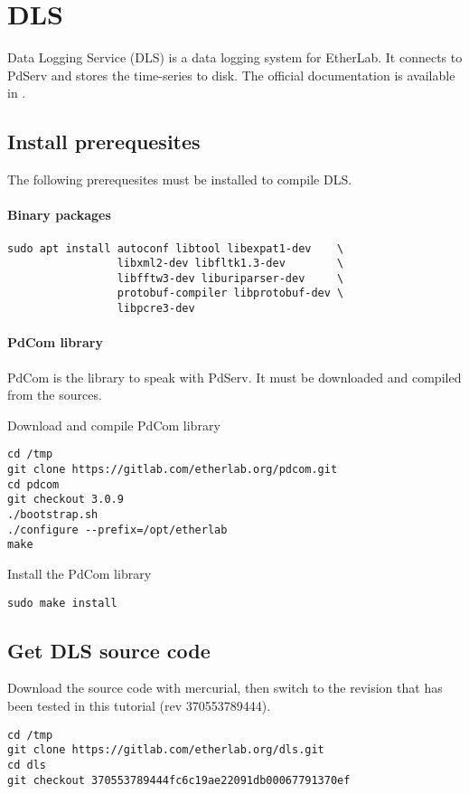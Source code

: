 \chapter{DLS}


\label{chap:dls}
Data Logging Service (DLS) is a data logging system for EtherLab. It
connects to PdServ and stores the time-series to disk.
The official documentation is available in \cite{dls_user_manual}.


\section{Install prerequesites}

The following prerequesites must be installed to compile DLS.

\subsubsection{Binary packages}
\begin{verbatim}
sudo apt install autoconf libtool libexpat1-dev    \
                 libxml2-dev libfltk1.3-dev        \
                 libfftw3-dev liburiparser-dev     \
                 protobuf-compiler libprotobuf-dev \
                 libpcre3-dev
\end{verbatim}

\subsubsection{PdCom library}
PdCom is the library to speak with PdServ. It must be downloaded and
compiled from the sources.

\noindent Download and compile PdCom library
\begin{verbatim}
cd /tmp
git clone https://gitlab.com/etherlab.org/pdcom.git
cd pdcom
git checkout 3.0.9
./bootstrap.sh
./configure --prefix=/opt/etherlab
make
\end{verbatim}

\noindent Install the PdCom library
\begin{verbatim}
sudo make install
\end{verbatim}



\section{Get DLS source code}
Download the source code with mercurial, then switch to the revision
that has been tested in this tutorial (rev 370553789444).
\begin{verbatim}
cd /tmp
git clone https://gitlab.com/etherlab.org/dls.git
cd dls
git checkout 370553789444fc6c19ae22091db00067791370ef
\end{verbatim}

